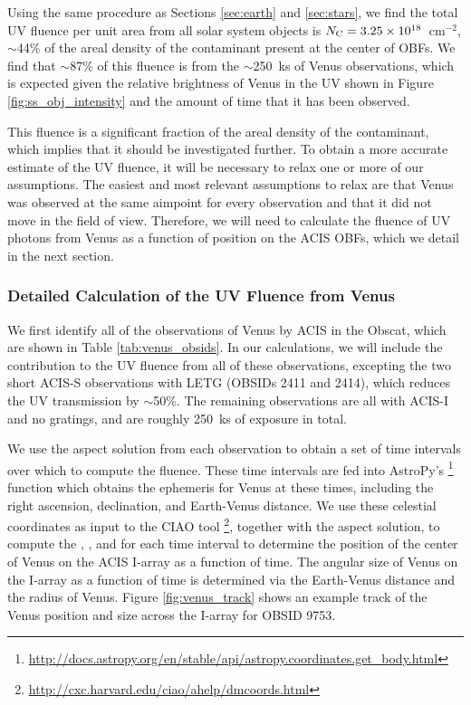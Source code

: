 \documentclass[11pt]{article}
\begin{document}


Using the same procedure as Sections \ref{sec:earth} and \ref{sec:stars}, we find the total UV fluence per unit area
from all solar system objects is $N_{\rm C} = 3.25 \times 10^{18}$~cm$^{-2}$, $\sim$44\% of the areal density of the
contaminant present at the center of OBFs. We find that $\sim$87\% of this fluence is from the $\sim$250~ks of Venus observations,
which is expected given the relative brightness of Venus in the UV shown in Figure \ref{fig:ss_obj_intensity} and the
amount of time that it has been observed.

This fluence is a significant fraction of the areal density of the contaminant, which implies that it should be
investigated further. To obtain a more accurate estimate of the UV fluence, it will be necessary to relax one or more of
our assumptions. The easiest and most relevant assumptions to relax are that Venus was observed at the same aimpoint for
every observation and that it did not move in the field of view. Therefore, we will need to calculate the fluence of UV
photons from Venus as a function of position on the ACIS OBFs, which we detail in the next section.

\subsubsection{Detailed Calculation of the UV Fluence from Venus}\label{sec:venus}

We first identify all of the observations of Venus by ACIS in the Obscat, which are shown in Table \ref{tab:venus_obsids}.
In our calculations, we will include the contribution to the UV fluence from all of these observations, excepting the
two short ACIS-S observations with LETG (OBSIDs 2411 and 2414), which reduces the UV transmission by $\sim$50\%. The
remaining observations are all with ACIS-I and no gratings, and are roughly 250~ks of exposure in total.



We use the aspect solution from each observation to obtain a set of time intervals over which to compute the fluence.
These time intervals are fed into AstroPy's
\footnote{\url{http://docs.astropy.org/en/stable/api/astropy.coordinates.get_body.html}}
function which obtains the ephemeris for Venus at these times, including the right ascension, declination, and
Earth-Venus distance. We use these celestial coordinates as input to the CIAO tool
\footnote{\url{http://cxc.harvard.edu/ciao/ahelp/dmcoords.html}}, together with the aspect solution,
to compute the , , and  for each time interval to determine the position of
the center of Venus on the ACIS I-array as a function of time. The angular size of Venus on the I-array as a function
of time is determined via the Earth-Venus distance and the radius of Venus. Figure \ref{fig:venus_track} shows
an example track of the Venus position and size across the I-array for OBSID 9753.
\end{document}
